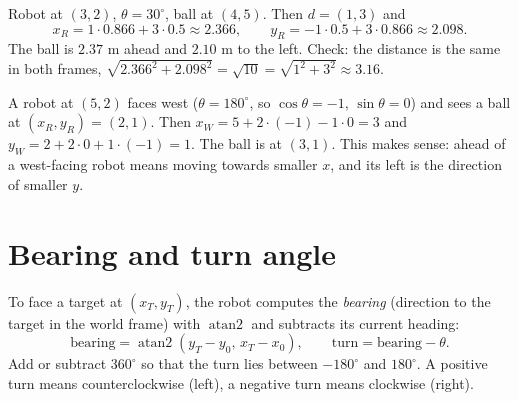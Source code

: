 \begin{example}
Robot at $(3,2)$, $\theta=30^\circ$, ball at $(4,5)$. Then $d=(1,3)$ and
\[
x_R=1\cdot0.866+3\cdot0.5\approx2.366,\qquad y_R=-1\cdot0.5+3\cdot0.866\approx2.098.
\]
The ball is $2.37$ m ahead and $2.10$ m to the left. Check: the distance is the same in both frames, $\sqrt{2.366^2+2.098^2}=\sqrt{10}=\sqrt{1^2+3^2}\approx3.16$.
\end{example}

\begin{example}
A robot at $(5,2)$ faces west ($\theta=180^\circ$, so $\cos\theta=-1$, $\sin\theta=0$) and sees a ball at $(x_R,y_R)=(2,1)$. Then $x_W=5+2\cdot(-1)-1\cdot0=3$ and $y_W=2+2\cdot0+1\cdot(-1)=1$. The ball is at $(3,1)$. This makes sense: ahead of a west-facing robot means moving towards smaller $x$, and its left is the direction of smaller $y$.
\end{example}

\section*{Bearing and turn angle}
To face a target at $(x_T,y_T)$, the robot computes the \emph{bearing} (direction to the target in the world frame) with $\operatorname{atan2}$ and subtracts its current heading:
\[
\text{bearing}=\operatorname{atan2}(y_T-y_0,\,x_T-x_0),\qquad
\text{turn}=\text{bearing}-\theta.
\]
Add or subtract $360^\circ$ so that the turn lies between $-180^\circ$ and $180^\circ$. A positive turn means counterclockwise (left), a negative turn means clockwise (right).

\begin{center}

\label{fig:b2_15}
\end{center}

